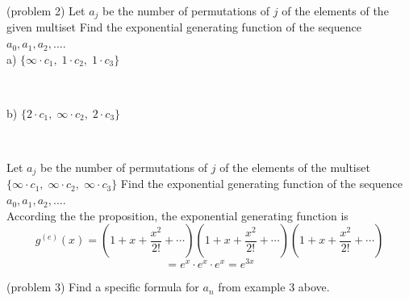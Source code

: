 \documentclass[handout]{ximera}
\begin{document}
\begin{problem}(problem 2)
Let $a_j$ be the number of permutations of $j$ of the elements of the given multiset 
Find the exponential generating function of the sequence $a_0, a_1, a_2, ...$.\\
a) $\{\infty  \cdot c_1, \;1 \cdot c_2,\; 1\cdot c_3\}$ 
\begin{multipleChoice}
\\
\end{multipleChoice}



b) $\{2 \cdot c_1,\; \infty \cdot c_2,\; 2 \cdot c_3\}$ 
\begin{multipleChoice}
\\
\end{multipleChoice}

\end{problem}




\begin{example}[example 3]
Let $a_j$ be the number of permutations of $j$ of the elements of the multiset $\{\infty \cdot c_1,\; \infty \cdot c_2, \;\infty \cdot c_3\}$
Find the exponential generating function of the sequence $a_0, a_1, a_2, ...$.\\
According the the proposition, the exponential generating function is
\[
g^{(e)}(x) = \left(1 + x + \frac{x^2}{2!} + \cdots \right)\left(1 + x + \frac{x^2}{2!} + \cdots \right)
\left(1 + x + \frac{x^2}{2!} + \cdots \right)
\]
\[
= e^x \cdot e^x \cdot e^x = e^{3x}
\]
\end{example}

\begin{problem}(problem 3)
Find a specific formula for $a_n$ from example 3 above.\\
\begin{multipleChoice}
\\
\\
\end{multipleChoice}
\end{problem}
\end{document}
